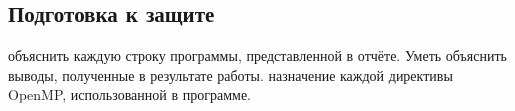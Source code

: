 { %
	\subsection{Подготовка к защите}
	\begin{enumerate}
		 объяснить каждую строку программы, представленной в отчёте. Уметь объяснить выводы, полученные в результате работы.
		 назначение каждой директивы OpenMP, использованной в программе.
	\end{enumerate}
}